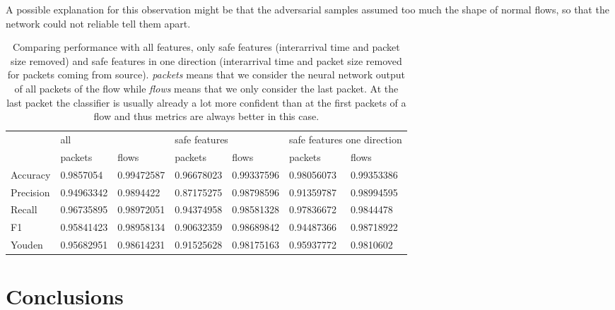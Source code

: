 \documentclass[conference]{IEEEtran}
\begin{document}

A possible explanation for this observation might be that the adversarial samples assumed too much the shape of normal flows, so that the network could not reliable tell them apart.

\begin{table}
\caption{Comparing performance with all features, only safe features (interarrival time and packet size removed) and safe features in one direction (interarrival time and packet size removed for packets coming from source). \textit{packets} means that we consider the neural network output of all packets of the flow while \textit{flows} means that we only consider the last packet. At the last packet the classifier is usually already a lot more confident than at the first packets of a flow and thus metrics are always better in this case.}  \label{tab:performance_results_no_manipulable}
\newcommand{\cmidrulespace}{6pt}
\centering
\begin{tabular}{l l l l l l l} \toprule
& \multicolumn{2}{l}{all} & \multicolumn{2}{l}{safe features} & \multicolumn{2}{l}{safe features one direction} \\
\cmidrule(r){2-3} \cmidrule(lr){4-5} \cmidrule(l){6-7}
& packets & flows & packets & flows & packets & flows \\
\midrule
Accuracy & 0.9857054 & 0.99472587 & 0.96678023 & 0.99337596 & 0.98056073 & 0.99353386 \\
Precision & 0.94963342 & 0.9894422 & 0.87175275 & 0.98798596 & 0.91359787 & 0.98994595 \\
Recall & 0.96735895 & 0.98972051 & 0.94374958 & 0.98581328 & 0.97836672 & 0.9844478 \\
F1 & 0.95841423 & 0.98958134 & 0.90632359 & 0.98689842 & 0.94487366 & 0.98718922 \\
Youden & 0.95682951 & 0.98614231 & 0.91525628 & 0.98175163 & 0.95937772 & 0.9810602 \\
\bottomrule
\end{tabular}
\end{table}

\section{Conclusions}
\end{document}
